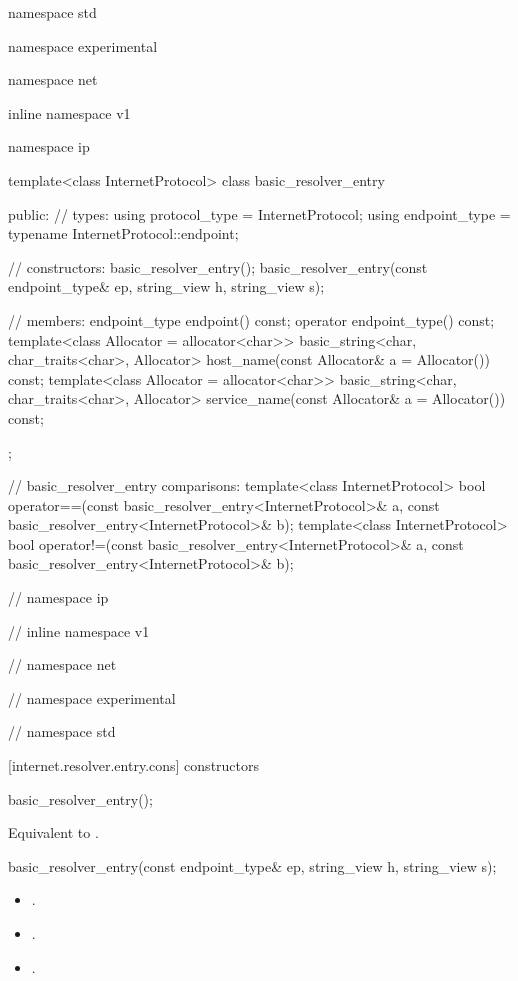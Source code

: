 \begin{codeblock}
namespace std {
namespace experimental {
namespace net {
inline namespace v1 {
namespace ip {

  template<class InternetProtocol>
  class basic_resolver_entry
  {
  public:
    // types:
    using protocol_type = InternetProtocol;
    using endpoint_type = typename InternetProtocol::endpoint;

    // constructors:
    basic_resolver_entry();
    basic_resolver_entry(const endpoint_type& ep,
                         string_view h,
                         string_view s);

    // members:
    endpoint_type endpoint() const;
    operator endpoint_type() const;
    template<class Allocator = allocator<char>>
      basic_string<char, char_traits<char>, Allocator>
        host_name(const Allocator& a = Allocator()) const;
    template<class Allocator = allocator<char>>
      basic_string<char, char_traits<char>, Allocator>
        service_name(const Allocator& a = Allocator()) const;
  };

  // basic_resolver_entry comparisons:
  template<class InternetProtocol>
    bool operator==(const basic_resolver_entry<InternetProtocol>& a,
                    const basic_resolver_entry<InternetProtocol>& b);
  template<class InternetProtocol>
    bool operator!=(const basic_resolver_entry<InternetProtocol>& a,
                    const basic_resolver_entry<InternetProtocol>& b);

} // namespace ip
} // inline namespace v1
} // namespace net
} // namespace experimental
} // namespace std
\end{codeblock}


[internet.resolver.entry.cons]{ constructors}

\begin{itemdecl}
basic_resolver_entry();
\end{itemdecl}

\begin{itemdescr}
\pnum
\effects Equivalent to .
\end{itemdescr}

\begin{itemdecl}
basic_resolver_entry(const endpoint_type& ep,
                     string_view h,
                     string_view s);
\end{itemdecl}

\begin{itemdescr}
\pnum
\postconditions 
\begin{itemize}
\item
{}.
\item
{}.
\item
{}.
\end{itemize}
\end{itemdescr}



